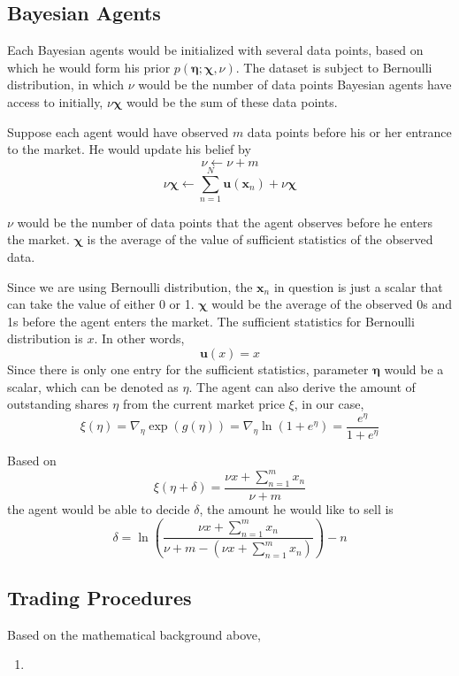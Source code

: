 \documentclass[12pt]{article}
\begin{document}
\subsection{Bayesian Agents}\label{Bayesian-agents}
Each Bayesian agents would be initialized with several data points, based on which he would form his prior $p(\boldsymbol{\eta}; \boldsymbol{\chi}, \nu)$. The dataset is subject to Bernoulli distribution, %
 in which $\nu$ would be the number of data points Bayesian agents have access to initially, $\nu\boldsymbol{\chi}$ would be the sum of these data points.

Suppose each agent would have observed $m$ data points before his or her entrance to the market. He would update his belief by %
$$\nu\leftarrow\nu+m$$ $$\nu\bm{\chi} \leftarrow \sum_{n=1}^{N} \mathbf{u}\left(\mathbf{x}_{n}\right)+\nu \bm{\chi}$$

$\nu$ would be the number of data points that the agent observes before he enters the market. $\boldsymbol{\chi}$ is the average of the value of sufficient statistics of the observed data.

Since we are using Bernoulli distribution, the $\mathbf{x}_n$ in question is just a scalar that can take the value of either 0 or 1. $\boldsymbol{\chi}$ would be the average of the observed 0s and 1s before the agent enters the market. The sufficient statistics for Bernoulli distribution is $x$. In other words,
\begin{displaymath}
\mathbf{u}(x) = x
\end{displaymath}
Since there is only one entry for the sufficient statistics, parameter $\boldsymbol{\eta}$ would be a scalar, which can be denoted as $\eta$. 
The agent can also derive the amount of outstanding shares $\eta$ from the current market price $\xi$, in our case, 
\begin{equation}
    \xi(\eta) = \nabla_{\eta}\exp{(g(\eta))}=\nabla_{\eta}\ln \left(1+e^{\eta}\right)=\frac{e^{\eta}}{1+e^{\eta}}
\end{equation}

Based on %
$$\xi(\eta+\delta)=\frac{\nu x+\sum_{n=1}^{m}x_n}{\nu+m}$$ the agent would be able to decide $\delta$, the amount he would like to sell is
$$
    \delta=\ln{\left( \frac{\nu x+\sum_{n=1}^{m}x_n}{\nu+m-(\nu x+\sum_{n=1}^{m}x_n)} \right)}-n
$$

\subsection{Trading Procedures}\label{trading-precedure}
Based on the mathematical background above, 
\begin{enumerate}
    \item 
\end{enumerate}
\end{document}
